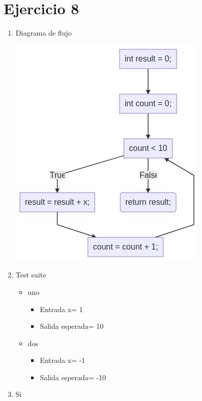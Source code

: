 \documentclass{article}
\begin{document}
\section*{Ejercicio 8}

\begin{enumerate}
    \item Diagrama de flujo
    
    \includegraphics[scale=0.65]{recursos/mult10.png}

    \item Test suite
        \begin{itemize}
            \item uno
                \begin{itemize}
                    \item Entrada x= 1
                    \item Salida esperada= 10
                \end{itemize}
            \item dos
                \begin{itemize}
                    \item Entrada x= -1
                    \item Salida esperada= -10
                \end{itemize}
        \end{itemize}

    \item Si
\end{enumerate}
\end{document}
